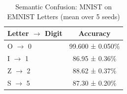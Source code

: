 
\begin{table}[h]
\centering
\caption{Semantic Confusion: MNIST on EMNIST Letters (mean over 5 seeds)}
\label{tab:extension_cross_dataset_emnist_letters}
\begin{tabular}{lc}
\toprule
\textbf{Letter $\rightarrow$ Digit} & \textbf{Accuracy} \\
\midrule
O $\rightarrow$ 0 & 99.600 ± 0.050\% \\
I $\rightarrow$ 1 & 86.95 ± 0.36\% \\
Z $\rightarrow$ 2 & 88.62 ± 0.37\% \\
S $\rightarrow$ 5 & 87.30 ± 0.20\% \\
\bottomrule
\end{tabular}
\end{table}
